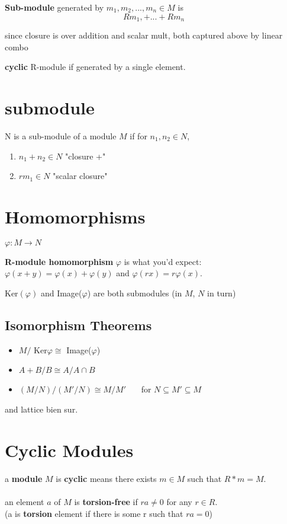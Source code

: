 \documentclass[12pt]{article}
\newcommand{\bt}[1]{\textbf{#1}} %
\begin{document}
\bt{Sub-module} generated by $m_1, m_2, ..., m_n \in M$ is 
$$R m_1, + ... + Rm_n$$

\textcolor[gray]{0.5}{since closure is over addition and scalar mult, both captured above by linear combo}

\bt{cyclic} R-module if generated by a single element.

\section*{submodule}
N is a sub-module of a module $M$ if for $n_1, n_2 \in N$, 
\begin{enumerate}
    \item $n_1 + n_2 \in N $ "closure +"
    \item $r m_1 \in N$ "scalar closure"
\end{enumerate}


\section*{Homomorphisms}
$\varphi: M \rightarrow N$

\bt{R-module homomorphism} $\varphi$ is what you'd expect:\\ $\varphi(x+y) = \varphi(x) + \varphi(y)$ and $\varphi(rx) = r \varphi(x)$.


Ker$(\varphi)$ and Image($\varphi$) are both submodules (in $M$, $N$ in turn)\\

\subsection*{Isomorphism Theorems}
\begin{itemize}
    \item $M / $ Ker$\varphi \cong $ Image($\varphi$)
    \item $A + B / B \cong A / A \cap B$
    \item $(M / N) / (M' / N) \cong M / M'$   \ \ \ for $N \subseteq M' \subseteq M$
\end{itemize}

and lattice bien sur. 

\section*{Cyclic Modules}
a \bt{module} $M$ is \bt{cyclic} means there exists $m \in M$  such that $R*m = M$.\\
\ \\
an element $a$ of $M$ is \bt{torsion-free} if $r a \neq 0$ for any $r \in R$.\\
(a is \bt{torsion} element if there is some r such that $ra = 0$)\\
\end{document}
